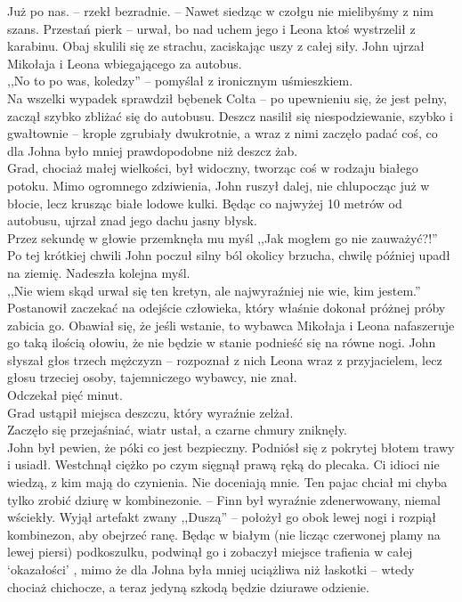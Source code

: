 \documentclass[../MAIN.tex]{subfiles}
\begin{document}
%
\sx Już po nas. -- rzekł bezradnie. -- Nawet siedząc w czołgu nie mielibyśmy z nim szans.
\xx Przestań pier\3k -- urwał, bo nad uchem jego i Leona ktoś wystrzelił z karabinu. Obaj skulili się ze strachu, zaciskając uszy z całej siły.
\qd
John ujrzał Mikołaja i Leona wbiegającego za autobus.\\
,,No to po was, koledzy'' -- pomyślał z ironicznym uśmieszkiem. \\
Na wszelki wypadek sprawdził bębenek Colta -- po upewnieniu się, że jest pełny, zaczął szybko zbliżać się do autobusu.
Deszcz nasilił się niespodziewanie, szybko i gwałtownie -- krople zgrubiały dwukrotnie, a wraz z nimi zaczęło padać coś, co dla Johna było mniej prawdopodobne niż deszcz żab. \\
Grad, chociaż małej wielkości, był widoczny, tworząc coś w rodzaju białego potoku. Mimo ogromnego zdziwienia, John ruszył dalej, nie chlupocząc już w błocie, lecz krusząc białe lodowe kulki. Będąc co najwyżej 10 metrów od autobusu, ujrzał znad jego dachu jasny błysk.\\
Przez sekundę w głowie przemknęła mu myśl ,,Jak mogłem go nie zauważyć?!''\\
Po tej krótkiej chwili John poczuł silny ból okolicy brzucha, chwilę później upadł na ziemię. Nadeszła kolejna myśl.\\
,,Nie wiem skąd urwał się ten kretyn, ale najwyraźniej nie wie, kim jestem.'' \\
Postanowił zaczekać na odejście człowieka, który właśnie dokonał próżnej próby zabicia go. Obawiał się, że jeśli wstanie, to wybawca Mikołaja i Leona nafaszeruje go taką ilością ołowiu, że nie będzie w stanie podnieść się na równe nogi. John słyszał głos trzech mężczyzn -- rozpoznał z nich Leona wraz z przyjacielem, lecz głosu trzeciej osoby, tajemniczego wybawcy, nie znał. \\
Odczekał pięć minut. \\
Grad ustąpił miejsca deszczu, który wyraźnie zelżał. \\
Zaczęło się przejaśniać, wiatr ustał, a czarne chmury zniknęły. \\
John był pewien, że póki co jest bezpieczny. Podniósł się z pokrytej błotem trawy i usiadł. Westchnął ciężko po czym sięgnął prawą ręką do plecaka.
%
\sx Ci idioci nie wiedzą, z kim mają do czynienia. Nie doceniają mnie. Ten pajac chciał mi chyba tylko zrobić dziurę w kombinezonie. -- Finn był wyraźnie zdenerwowany, niemal wściekły.
\qd
Wyjął artefakt zwany ,,Duszą'' -- położył go obok lewej nogi i rozpiął kombinezon, aby obejrzeć ranę. Będąc w białym (nie licząc czerwonej plamy na lewej piersi) podkoszulku, podwinął go i zobaczył miejsce trafienia w całej ‘okazałości’ , mimo że dla Johna była mniej uciążliwa niż łaskotki -- wtedy chociaż chichocze, a teraz jedyną szkodą będzie dziurawe odzienie. \\
\end{document}

